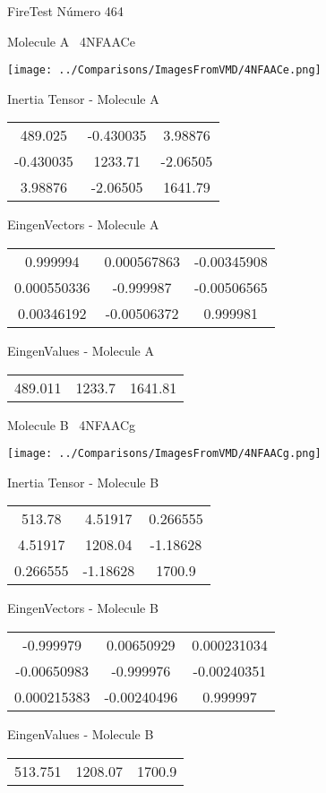 \vtab[-3cm]
\begin{center}
{\large FireTest \tab Número 464}
\end{center}
\begin{multicols}{2}
\begin{center}

Molecule A \
4NFAACe

\texttt{[image: ../Comparisons/ImagesFromVMD/4NFAACe.png]}

Inertia Tensor - Molecule A \\
\begin{tabular}{|c c c|}
489.025	 & 	-0.430035	 & 	3.98876	 \\
-0.430035	 & 	1233.71	 & 	-2.06505	 \\
3.98876	 & 	-2.06505	 & 	1641.79
\end{tabular}

\vtab
 EingenVectors - Molecule A     \\
\begin{tabular}{|c c c|}
0.999994	 & 	0.000567863	 & 	-0.00345908	 \\
0.000550336	 & 	-0.999987	 & 	-0.00506565	 \\
0.00346192	 & 	-0.00506372	 & 	0.999981
\end{tabular}

\vtab
 EingenValues - Molecule A     \\
\begin{tabular}{|c c c|}
489.011	 & 	1233.7	 & 	1641.81	 \\
\end{tabular}
\columnbreak

Molecule B \
4NFAACg

\texttt{[image: ../Comparisons/ImagesFromVMD/4NFAACg.png]}

Inertia Tensor - Molecule B \\
\begin{tabular}{|c c c|}
513.78	 & 	4.51917	 & 	0.266555	 \\
4.51917	 & 	1208.04	 & 	-1.18628	 \\
0.266555	 & 	-1.18628	 & 	1700.9
\end{tabular}

\vtab
 EingenVectors - Molecule B     \\
\begin{tabular}{|c c c|}
-0.999979	 & 	0.00650929	 & 	0.000231034	 \\
-0.00650983	 & 	-0.999976	 & 	-0.00240351	 \\
0.000215383	 & 	-0.00240496	 & 	0.999997
\end{tabular}

\vtab
 EingenValues - Molecule B     \\
\begin{tabular}{|c c c|}
513.751	 & 	1208.07	 & 	1700.9	 \\
\end{tabular}

\end{center}
\end{multicols}

